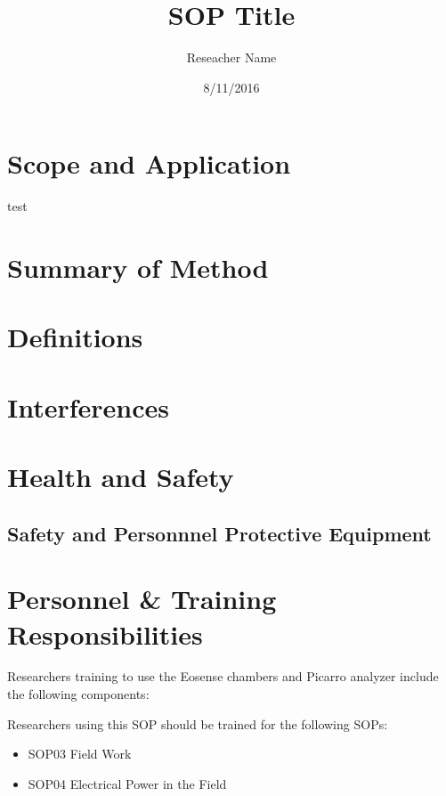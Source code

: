 \documentclass[12pt]{../SOP2}
\title{SOP Title}
\date{8/11/2016}
\author{Reseacher Name}
\begin{document}


\maketitle

\section{Scope and Application}

\NP \blindtext

\NP test

\section{Summary of Method}

\section{Definitions}

\NP \lipsum[1]

\section{Interferences}

\section{Health and Safety}

\NP \lipsum[2]

\subsection{Safety and Personnnel Protective Equipment}


\section{Personnel \& Training Responsibilities}

Researchers training to use the Eosense chambers and Picarro analyzer include the following components: 



Researchers using this SOP should be trained for the following SOPs:

\begin{itemize}
  \item SOP03 Field Work
  \item SOP04 Electrical Power in the Field
\end{itemize}
\end{document}
